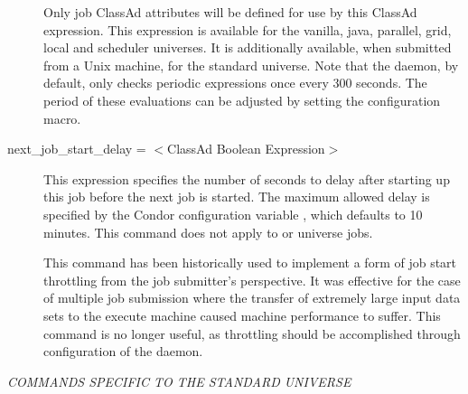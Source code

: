 \begin{description}
Only job ClassAd attributes will be defined for use by this ClassAd expression.
This expression is available for the vanilla, java, parallel, grid,
local and scheduler universes.
It is additionally available, when submitted from a Unix machine,
for the standard universe.  Note that the  daemon,
by default, only checks
periodic expressions once every 300 seconds.  The period of
these evaluations can be adjusted by setting the
 configuration macro.


\item[next\_job\_start\_delay = $<$ClassAd Boolean Expression$>$]
This expression specifies the number of seconds to delay after starting up
this job before the next job is started.  The maximum
allowed delay is specified by the Condor configuration variable
, which defaults to 10 minutes.
This command does not apply to 
or  universe jobs.

This command has been historically used to implement a form
of job start throttling from the job submitter's perspective.
It was effective for the case of multiple job submission where
the transfer of extremely large input data sets to the execute
machine caused machine performance to suffer.
This command is no longer useful, as throttling should be
accomplished through configuration of the  daemon.

\end{description} 



\emph{COMMANDS SPECIFIC TO THE STANDARD UNIVERSE}

